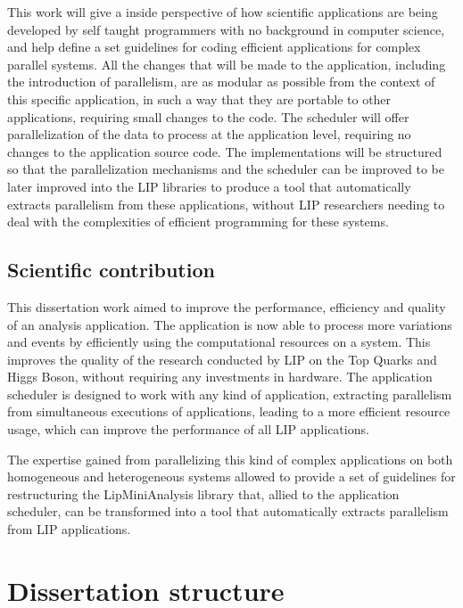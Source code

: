 This work will give a inside perspective of how scientific applications are being developed by self taught programmers with no background in computer science, and help define a set guidelines for coding efficient applications for complex parallel systems. All the changes that will be made to the \tth application, including the introduction of parallelism, are as modular as possible from the context of this specific application, in such a way that they are portable to other applications, requiring small changes to the code. The scheduler will offer parallelization of the data to process at the application level, requiring no changes to the application source code. The implementations will be structured so that the parallelization mechanisms and the scheduler can be improved to be later improved into the LIP libraries to produce a tool that automatically extracts parallelism from these applications, without LIP researchers needing to deal with the complexities of efficient programming for these systems.

\subsection{Scientific contribution}
\label{ScientificContribution}

This dissertation work aimed to improve the performance, efficiency and quality of an analysis application. The application is now able to process more variations and events by efficiently using the computational resources on a system. This improves the quality of the research conducted by LIP on the Top Quarks and Higgs Boson, without requiring any investments in hardware. The application scheduler is designed to work with any kind of application, extracting parallelism from simultaneous executions of applications, leading to a more efficient resource usage, which can improve the performance of all LIP applications.

The expertise gained from parallelizing this kind of complex applications on both homogeneous and heterogeneous systems allowed to provide a set of guidelines for restructuring the LipMiniAnalysis library that, allied to the application scheduler, can be transformed into a tool that automatically extracts parallelism from LIP applications.

\section{Dissertation structure}
\label{DissertationStructure}

